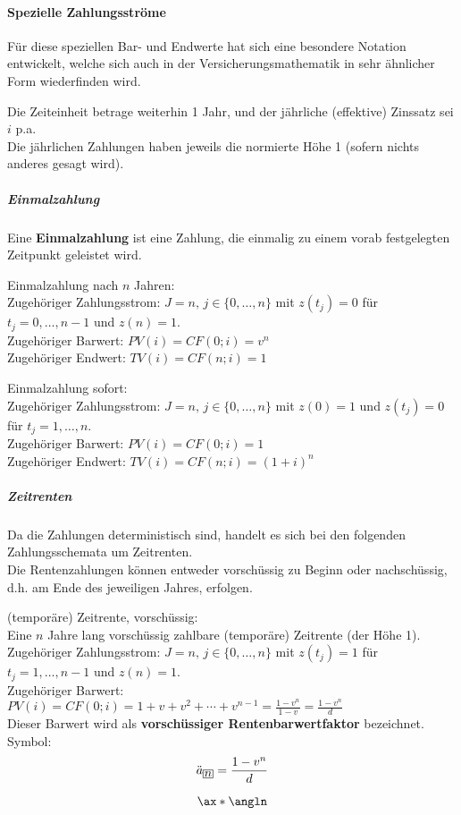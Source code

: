 \documentclass[
]{article}
\begin{document}
\hypertarget{spezielle-zahlungsstruxf6me}{%
\paragraph{Spezielle Zahlungsströme}\label{spezielle-zahlungsstruxf6me}}

Für diese speziellen Bar- und Endwerte hat sich eine besondere Notation
entwickelt, welche sich auch in der Versicherungsmathematik in sehr
ähnlicher Form wiederfinden wird.

Die Zeiteinheit betrage weiterhin 1 Jahr, und der jährliche (effektive)
Zinssatz sei \(i\) p.a.\\
Die jährlichen Zahlungen haben jeweils die normierte Höhe 1 (sofern
nichts anderes gesagt wird).

\hypertarget{einmalzahlung}{%
\subparagraph{Einmalzahlung}\label{einmalzahlung}}

Eine \textbf{Einmalzahlung} ist eine Zahlung, die einmalig zu einem
vorab festgelegten Zeitpunkt geleistet wird.

Einmalzahlung nach \(n\) Jahren:\\
Zugehöriger Zahlungsstrom: \(J=n,\, j\in\{0,\dots,n\}\) mit \(z(t_j)=0\)
für \(t_j= 0,\dots,n-1\) und \(z(n)=1\).\\
Zugehöriger Barwert: \(PV(i) = CF(0;i) = v^n\)\\
Zugehöriger Endwert: \(TV(i) = CF(n;i) = 1\)

Einmalzahlung sofort:\\
Zugehöriger Zahlungsstrom: \(J=n,\, j\in\{0,\dots,n\}\) mit \(z(0)=1\)
und \(z(t_j)=0\) für \(t_j= 1,\dots,n\).\\
Zugehöriger Barwert: \(PV(i) = CF(0;i) = 1\)\\
Zugehöriger Endwert: \(TV(i) = CF(n;i) = (1+i)^n\)

\hypertarget{zeitrenten}{%
\subparagraph{Zeitrenten}\label{zeitrenten}}

Da die Zahlungen deterministisch sind, handelt es sich bei den folgenden
Zahlungsschemata um Zeitrenten.\\
Die Rentenzahlungen können entweder vorschüssig zu Beginn oder
nachschüssig, d.h. am Ende des jeweiligen Jahres, erfolgen.

(temporäre) Zeitrente, vorschüssig:\\
Eine \(n\) Jahre lang vorschüssig zahlbare (temporäre) Zeitrente (der
Höhe 1).\\
Zugehöriger Zahlungsstrom: \(J=n,\, j\in\{0,\dots,n\}\) mit \(z(t_j)=1\)
für \(t_j= 1,\dots,n-1\) und \(z(n)=1\).\\
Zugehöriger Barwert:
\(PV(i) = CF(0;i) = 1 + v + v^2 + \cdots + v^{n-1} = \frac{1-v^n}{1-v} = \frac{1-v^n}{d}\)\\
Dieser Barwert wird als \textbf{vorschüssiger Rentenbarwertfaktor}
bezeichnet. Symbol: \[
  \ddot{a}_{\tikz[baseline=(n.base)]{\node[inner sep=1pt,draw,rectangle] (n) {\( n \)};}} = \frac{1 - v^n}{d}
\]

\[
  \ax*{\angln}
\]
\end{document}
